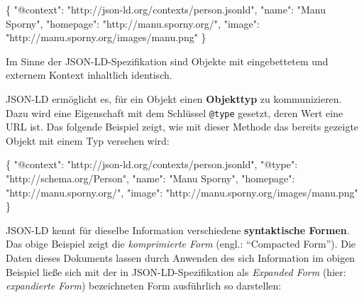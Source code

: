\documentclass[,a4paper]{article}
\newenvironment{Shaded}{}{}
\newcommand{\DataTypeTok}[1]{\textcolor[rgb]{0.56,0.13,0.00}{{#1}}}
\newcommand{\StringTok}[1]{\textcolor[rgb]{0.25,0.44,0.63}{{#1}}}
\newcommand{\FunctionTok}[1]{\textcolor[rgb]{0.02,0.16,0.49}{{#1}}}
\begin{document}
\begin{Shaded}
\begin{Highlighting}[]
\FunctionTok{\{}
    \DataTypeTok{"@context"}\FunctionTok{:} \StringTok{"http://json-ld.org/contexts/person.jsonld"}\FunctionTok{,}
    \DataTypeTok{"name"}\FunctionTok{:} \StringTok{"Manu Sporny"}\FunctionTok{,}
    \DataTypeTok{"homepage"}\FunctionTok{:} \StringTok{"http://manu.sporny.org/"}\FunctionTok{,}
    \DataTypeTok{"image"}\FunctionTok{:} \StringTok{"http://manu.sporny.org/images/manu.png"}
\FunctionTok{\}}
\end{Highlighting}
\end{Shaded}

Im Sinne der JSON-LD-Spezifikation sind Objekte mit eingebettetem und
externem Kontext inhaltlich identisch.

JSON-LD ermöglicht es, für ein Objekt einen \textbf{Objekttyp} zu
kommunizieren. Dazu wird eine Eigenschaft mit dem Schlüssel
\texttt{@type} gesetzt, deren Wert eine URL ist. Das folgende Beispiel
zeigt, wie mit dieser Methode das bereits gezeigte Objekt mit einem Typ
versehen wird:

\begin{Shaded}
\begin{Highlighting}[]
\FunctionTok{\{}
    \DataTypeTok{"@context"}\FunctionTok{:} \StringTok{"http://json-ld.org/contexts/person.jsonld"}\FunctionTok{,}
    \DataTypeTok{"@type"}\FunctionTok{:} \StringTok{"http://schema.org/Person"}\FunctionTok{,}
    \DataTypeTok{"name"}\FunctionTok{:} \StringTok{"Manu Sporny"}\FunctionTok{,}
    \DataTypeTok{"homepage"}\FunctionTok{:} \StringTok{"http://manu.sporny.org/"}\FunctionTok{,}
    \DataTypeTok{"image"}\FunctionTok{:} \StringTok{"http://manu.sporny.org/images/manu.png"}
\FunctionTok{\}}
\end{Highlighting}
\end{Shaded}

JSON-LD kennt für dieselbe Information verschiedene \textbf{syntaktische
Formen}. Das obige Beispiel zeigt die \emph{komprimierte Form} (engl.:
``Compacted Form''). Die Daten dieses Dokuments lassen durch Anwenden
des sich Information im obigen Beispiel ließe sich mit der in
JSON-LD-Spezifikation als \emph{Expanded Form} (hier: \emph{expandierte
Form}) bezeichneten Form ausführlich so darstellen:
\end{document}
